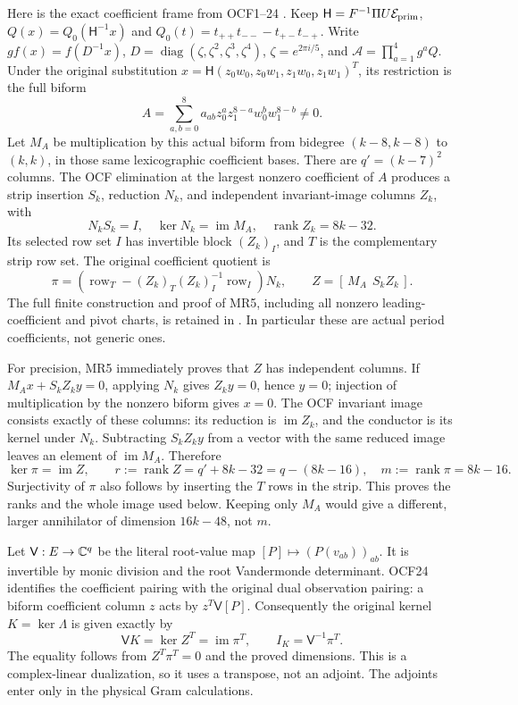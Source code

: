 Here is the exact coefficient frame from OCF1--24 \cite{mrroot:OCF}.
Keep $\mathsf H=F^{-1}\Pi U\mathcal E_{\rm prim}$,
$Q(x)=Q_0(\mathsf H^{-1}x)$ and
$Q_0(t)=t_{++}t_{--}-t_{+-}t_{-+}$.
Write $g f(x)=f(D^{-1}x)$,
$D=\operatorname{diag}(\zeta,\zeta^2,\zeta^3,\zeta^4)$,
$\zeta=e^{2\pi i/5}$, and $\mathcal A=\prod_{a=1}^4g^aQ$.
Under the original substitution
$x=\mathsf H(z_0w_0,z_0w_1,z_1w_0,z_1w_1)^T$, its restriction is the
full biform
\[
 A=\sum_{a,b=0}^8a_{ab}z_0^az_1^{8-a}w_0^bw_1^{8-b}\ne0.
 \tag{MR4}
\]
Let $M_A$ be multiplication by this actual biform from bidegree
$(k-8,k-8)$ to $(k,k)$, in those same lexicographic coefficient bases.
There are $q'=(k-7)^2$ columns. The OCF elimination at the largest
nonzero coefficient of $A$ produces a strip insertion $S_k$, reduction
$N_k$, and independent invariant-image columns $Z_k$, with
\[
 N_kS_k=I,\quad \ker N_k=\operatorname{im}M_A,\quad
 \operatorname{rank}Z_k=8k-32.\tag{MR5}
\]
Its selected row set $I$ has invertible block $(Z_k)_I$, and $T$ is
the complementary strip row set. The original coefficient quotient is
\[
 \pi=(\operatorname{row}_T-(Z_k)_T(Z_k)_I^{-1}
                   \operatorname{row}_I)N_k,
 \qquad Z=[\,M_A\ \ S_kZ_k\,].\tag{MR6}
\]
The full finite construction and proof of MR5, including all nonzero
leading-coefficient and pivot charts, is retained in \cite{mrroot:OCF}.
In particular these are actual period coefficients, not generic ones.

For precision, MR5 immediately proves that $Z$ has independent columns.
If $M_Ax+S_kZ_ky=0$, applying $N_k$ gives $Z_ky=0$, hence $y=0$;
injection of multiplication by the nonzero biform gives $x=0$.
The OCF invariant image consists exactly of these columns: its reduction
is $\operatorname{im}Z_k$, and the conductor is its kernel under $N_k$.
Subtracting $S_kZ_ky$ from a vector with the same reduced image leaves
an element of $\operatorname{im}M_A$. Therefore
\[
 \ker\pi=\operatorname{im}Z,\qquad
 r:=\operatorname{rank}Z=q'+8k-32=q-(8k-16),
 \quad m:=\operatorname{rank}\pi=8k-16.\tag{MR7}
\]
Surjectivity of $\pi$ also follows by inserting the $T$ rows in the
strip. This proves the ranks and the whole image used below. Keeping
only $M_A$ would give a different, larger annihilator of dimension
$16k-48$, not $m$.

Let $\mathsf V:E\to\mathbb C^q$ be the literal root-value map
$[P]\mapsto(P(v_{ab}))_{ab}$. It is invertible by monic division
and the root Vandermonde determinant. OCF24 identifies the coefficient
pairing with the original dual observation pairing: a biform coefficient
column $z$ acts by $z^T\mathsf V[P]$. Consequently the original kernel
$K=\ker\Lambda$ is given exactly by
\[
 \mathsf V K=\ker Z^T=\operatorname{im}\pi^T,
 \qquad I_K=\mathsf V^{-1}\pi^T.\tag{MR8}
\]
The equality follows from $Z^T\pi^T=0$ and the proved dimensions.
This is a complex-linear dualization, so it uses a transpose, not an
adjoint. The adjoints enter only in the physical Gram calculations.

